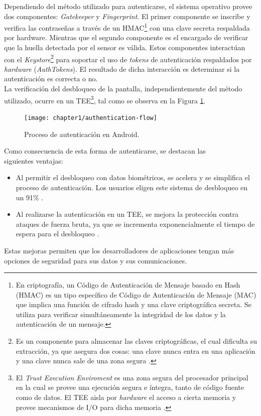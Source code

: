 Dependiendo del método utilizado para autenticarse, el sistema operativo provee dos componentes: \textit{Gatekeeper} y \textit{Fingerprint}. El primer componente se inscribe y verifica las contraseñas a través de un HMAC\footnote{En criptografía, un Código de Autenticación de Mensaje basado en Hash (HMAC) es un tipo específico de Código de Autenticación de Mensaje (MAC) que implica una función de cifrado hash y una clave criptográfica secreta. Se utiliza para verificar simultáneamente la integridad de los datos y la autenticación de un mensaje.} con una clave secreta respaldada por hardware. Mientras que el segundo componente es el encargado de verificar que la huella detectada por el sensor es válida. Estos componentes interactúan con el \textit{Keystore}\footnote{Es un componente para almacenar las claves criptográficas, el cual dificulta su extracción, ya que asegura dos cosas: una clave nunca entra en una aplicación y una clave nunca sale de una zona segura \cite{dakss}.} para soportar el uso de \textit{tokens} de autenticación respaldados por \textit{hardware} (\textit{AuthTokens}). El resultado de dicha interacción es determinar si la autenticación es correcta o no.\\

La verificación del desbloqueo de la pantalla, independientemente del método utilizado, ocurre en un TEE\footnote{El \textit{Trust Execution Enviroment} es una zona segura del procesador principal en la cual se provee una ejecución segura e íntegra, tanto de código fuente como de datos. El TEE aisla por \textit{hardware} el acceso a cierta memoria y provee mecanismos de I/O para dicha memoria \cite{tee2011}.}, tal como se observa en la Figura \ref{fig:ch01:authentication-flow}.\\

\begin{figure}[htbp]
	\begin{center}
		\texttt{[image: chapter1/authentication-flow]}
		\caption{Proceso de autenticación en Android\cite{aossec}.}
		\label{fig:ch01:authentication-flow}
	\end{center}
\end{figure}
Como consecuencia de esta forma de autenticarse, se destacan las \\siguientes ventajas:
\begin{itemize}
    \item Al permitir el desbloqueo con datos biométricos, se acelera y se simplifica el proceso de autenticación. Los usuarios eligen este sistema de desbloqueo en un 91\% \cite{asreview2015}.
    \item Al realizarse la autenticación en un TEE, se mejora la protección contra ataques de fuerza bruta, ya que se incrementa exponencialmente el tiempo de espera para el desbloqueo \cite{asreview2015}.
\end{itemize}
Estas mejoras permiten que los desarrolladores de aplicaciones tengan más opciones de seguridad para sus datos y sus comunicaciones.
